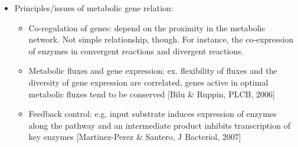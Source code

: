 \documentclass{report}
\begin{document}
\begin{itemize}
\item Principles/issues of metabolic gene relation: 
\begin{itemize}
	\item Co-regulation of genes: depend on the proximity in the metabolic network. Not simple relationship, though. For instance, the co-expression of enzymes in convergent reactions and divergent reactions. 
	\item Metabolic fluxes and gene expression: ex. flexibility of fluxes and the diversity of gene expression are correlated, genes active in optimal metabolic fluxes tend to be conserved [Bilu \& Ruppin, PLCB, 2006]
	\item Feedback control: e.g. input substrate induces expression of enzymes along the pathway and an intermediate product inhibits transcription of key enzymes [Martinez-Perez \& Santero, J Bacteriol, 2007]
\end{itemize}
\end{itemize}
\end{document}
